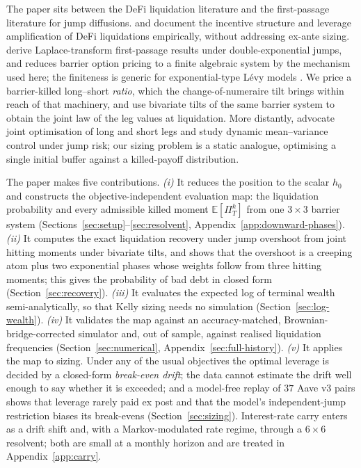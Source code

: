 \documentclass[11pt]{article}
\newcommand{\E}{\mathbb{E}}
\theoremstyle{plain}
\theoremstyle{definition}
\theoremstyle{remark}
\begin{document}
The paper sits between the DeFi liquidation literature and the first-passage literature for jump
diffusions. \citet{Qin2021} and \citet{HeimbachHuang2024} document the incentive structure and
leverage amplification of DeFi liquidations empirically, without addressing ex-ante sizing.
\citet{KouWang2003} derive Laplace-transform first-passage results under double-exponential jumps,
and \citet{Sepp2004} reduces barrier option pricing to a finite algebraic system by the mechanism
used here; the finiteness is generic for exponential-type L\'evy models \citep{Cai2009,CaiKou2011,
AsmussenAvramPistorius2004}. We price a barrier-killed long--short \emph{ratio}, which the
change-of-numeraire tilt brings within reach of that machinery, and use bivariate tilts of the same
barrier system to obtain the joint law of the leg values at liquidation. More distantly,
\citet{JacobsLevyStarer1999} advocate joint optimisation of long and short legs and
\citet{DangForsyth2016} study dynamic mean--variance control under jump risk; our sizing problem is
a static analogue, optimising a single initial buffer against a killed-payoff distribution.

The paper makes five contributions.
\emph{(i)} It reduces the position to the scalar $h_0$ and constructs the objective-independent
evaluation map: the liquidation probability and every admissible killed moment $\E[\Pi_T^k]$ from
one $3\times3$ barrier system (Sections~\ref{sec:setup}--\ref{sec:resolvent},
Appendix~\ref{app:downward-phases}).
\emph{(ii)} It computes the exact liquidation recovery under jump overshoot from joint hitting
moments under bivariate tilts, and shows that the overshoot is a creeping atom plus two exponential
phases whose weights follow from three hitting moments; this gives the probability of bad debt in
closed form (Section~\ref{sec:recovery}).
\emph{(iii)} It evaluates the expected log of terminal wealth semi-analytically, so that Kelly
sizing needs no simulation (Section~\ref{sec:log-wealth}).
\emph{(iv)} It validates the map against an accuracy-matched, Brownian-bridge-corrected simulator
and, out of sample, against realised liquidation frequencies (Section~\ref{sec:numerical},
Appendix~\ref{sec:full-history}).
\emph{(v)} It applies the map to sizing. Under any of the usual objectives the optimal leverage is
decided by a closed-form \emph{break-even drift}; the data cannot estimate the drift well enough to
say whether it is exceeded; and a model-free replay of $37$ Aave v3 pairs shows that leverage rarely
paid ex post and that the model's independent-jump restriction biases its break-evens
(Section~\ref{sec:sizing}).
Interest-rate carry enters as a drift shift and, with a Markov-modulated rate regime, through a
$6\times6$ resolvent; both are small at a monthly horizon and are treated in
Appendix~\ref{app:carry}.
\end{document}
